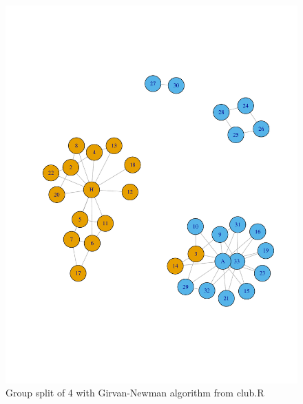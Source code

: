 \documentclass[letterpaper,11pt]{article}
\begin{document}
\begin{figure}[h]
\centering
\includegraphics[scale=0.6]{predictedSplit4.pdf}
\caption{Group split of 4 with Girvan-Newman algorithm from club.R}
\label{fig:split4}
\end{figure}
\end{document}
